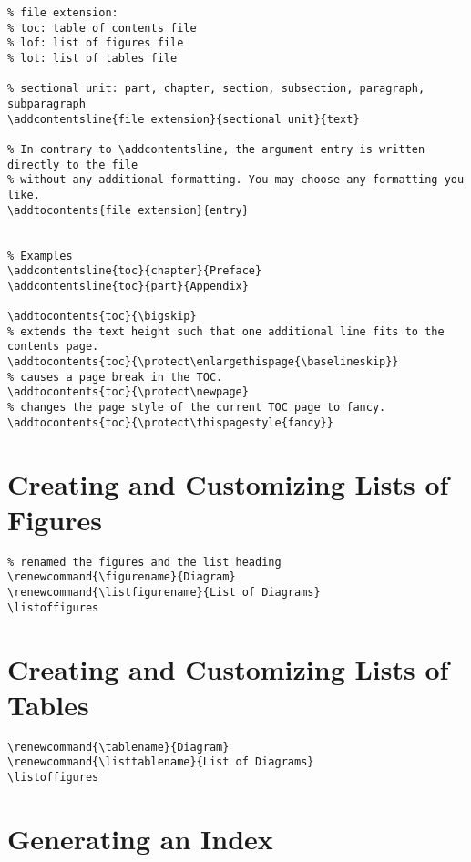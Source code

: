 \begin{lstlisting}
% file extension:
% toc: table of contents file
% lof: list of figures file
% lot: list of tables file

% sectional unit: part, chapter, section, subsection, paragraph, subparagraph
\addcontentsline{file extension}{sectional unit}{text}

% In contrary to \addcontentsline, the argument entry is written directly to the file
% without any additional formatting. You may choose any formatting you like.
\addtocontents{file extension}{entry}


% Examples
\addcontentsline{toc}{chapter}{Preface}
\addcontentsline{toc}{part}{Appendix}

\addtocontents{toc}{\bigskip}
% extends the text height such that one additional line fits to the contents page.
\addtocontents{toc}{\protect\enlargethispage{\baselineskip}}
% causes a page break in the TOC.
\addtocontents{toc}{\protect\newpage} 
% changes the page style of the current TOC page to fancy.
\addtocontents{toc}{\protect\thispagestyle{fancy}} 

\end{lstlisting}



\section{Creating and Customizing Lists of Figures}
\label{sec:creat-cust-lists}

\begin{lstlisting}
% renamed the figures and the list heading 
\renewcommand{\figurename}{Diagram}
\renewcommand{\listfigurename}{List of Diagrams}
\listoffigures
\end{lstlisting}


\section{Creating and Customizing Lists of Tables}
\label{sec:creat-cust-lists-1}

\begin{lstlisting}
\renewcommand{\tablename}{Diagram}
\renewcommand{\listtablename}{List of Diagrams}
\listoffigures
\end{lstlisting}


\section{Generating an Index}
\label{sec:generating-an-index}

